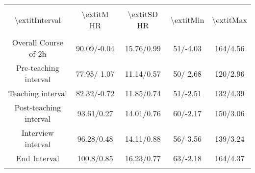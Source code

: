 
\begin{table}[h] \centering 
  \caption{} 
  \label{} 
\begin{tabular}{@{\extracolsep{5pt}} ccccc} 
\\[-1.8ex]\hline 
\hline \\[-1.8ex] 
\textbackslash 	extit{Interval} & \textbackslash 	extit{M HR} & \textbackslash 	extit{SD HR} & \textbackslash 	extit{Min} & \textbackslash 	extit{Max} \\ 
\hline \\[-1.8ex] 
Overall Course of 2h & 90.09/-0.04 & 15.76/0.99 & 51/-4.03 & 164/4.56 \\ 
Pre-teaching interval & 77.95/-1.07 & 11.14/0.57 & 50/-2.68 & 120/2.96 \\ 
Teaching interval & 82.32/-0.72 & 11.85/0.74 & 51/-2.51 & 132/4.39 \\ 
Post-teaching interval & 93.61/0.27 & 14.01/0.76 & 60/-2.17 & 150/3.06 \\ 
Interview interval & 96.28/0.48 & 14.11/0.88 & 56/-3.56 & 139/3.24 \\ 
End Interval & 100.8/0.85 & 16.23/0.77 & 63/-2.18 & 164/4.37 \\ 
\hline \\[-1.8ex] 
\end{tabular} 
\end{table} 
